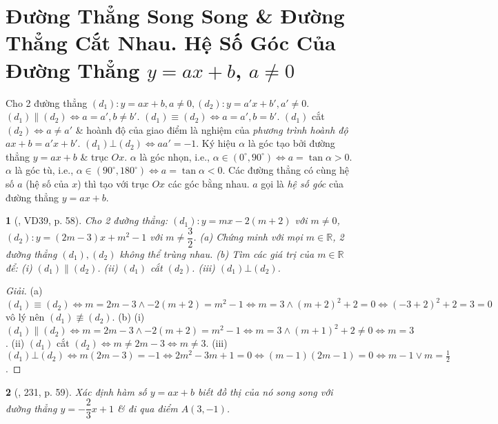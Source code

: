 \documentclass{article}
\newtheorem{baitoan}{}
\begin{document}
\section{Đường Thẳng Song Song \& Đường Thẳng Cắt Nhau. Hệ Số Góc Của Đường Thẳng $y = ax + b$, $a\ne0$}
 Cho 2 đường thẳng $(d_1):y = ax + b,a\ne0,(d_2):y = a'x + b',a'\ne0$. $(d_1)\parallel(d_2)\Leftrightarrow a = a',b\ne b'$. $(d_1)\equiv(d_2)\Leftrightarrow a = a',b = b'$. $(d_1)$ cắt $(d_2)\Leftrightarrow a\ne a'$ \& hoành độ của giao điểm là nghiệm của \textit{phương trình hoành độ} $ax + b = a'x + b'$. $(d_1)\bot(d_2)\Leftrightarrow aa' = -1$.  Ký hiệu $\alpha$ là góc tạo bởi đường thẳng $y = ax + b$ \& trục $Ox$. $\alpha$ là góc nhọn, i.e., $\alpha\in(0^\circ,90^\circ)\Leftrightarrow a = \tan\alpha > 0$. $\alpha$ là góc tù, i.e., $\alpha\in(90^\circ,180^\circ)\Leftrightarrow a = \tan\alpha < 0$. Các đường thẳng có cùng hệ số $a$ (hệ số của $x$) thì tạo với trục $Ox$ các góc bằng nhau. $a$ gọi là \textit{hệ số góc} của đường thẳng $y = ax + b$. 

\begin{baitoan}[\cite{Tuyen_Toan_8}, VD39, p. 58]
	Cho 2 đường thẳng: $(d_1):y = mx - 2(m + 2)$ với $m\ne0$, $(d_2):y = (2m - 3)x + m^2 - 1$ với $m\ne\dfrac{3}{2}$. (a) Chứng minh với mọi $m\in\mathbb{R}$, 2 đường thẳng $(d_1),(d_2)$ không thể trùng nhau. (b) Tìm các giá trị của $m\in\mathbb{R}$ để: (i) $(d_1)\parallel(d_2)$. (ii) $(d_1)$ cắt $(d_2)$. (iii) $(d_1)\bot(d_2)$.
\end{baitoan}

\begin{proof}[Giải]
	(a) $(d_1)\equiv(d_2)\Leftrightarrow m = 2m - 3\land-2(m + 2) = m^2 - 1\Leftrightarrow m = 3\land(m + 2)^2 + 2 = 0\Leftrightarrow(-3 + 2)^2 + 2 = 3 = 0$ vô lý nên $(d_1)\not\equiv(d_2)$. (b) (i) $(d_1)\parallel(d_2)\Leftrightarrow m = 2m - 3\land -2(m + 2) = m^2 - 1\Leftrightarrow m = 3\land(m + 1)^2 + 2\ne0\Leftrightarrow m = 3$. (ii) $(d_1)$ cắt $(d_2)\Leftrightarrow m\ne2m - 3\Leftrightarrow m\ne3$. (iii) $(d_1)\bot(d_2)\Leftrightarrow m(2m - 3) = -1\Leftrightarrow2m^2 - 3m + 1 = 0\Leftrightarrow(m - 1)(2m - 1) = 0\Leftrightarrow m - 1\lor m = \frac{1}{2}$.
\end{proof}

\begin{baitoan}[\cite{Tuyen_Toan_8}, 231, p. 59]
	Xác định hàm số $y = ax + b$ biết đồ thị của nó song song với đường thẳng $y = -\dfrac{2}{3}x + 1$ \& đi qua điểm $A(3,-1)$.
\end{baitoan}
\end{document}
